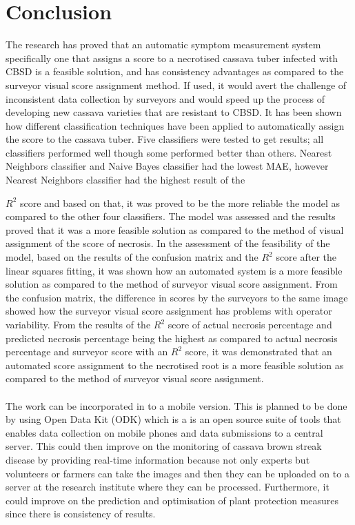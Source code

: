 \documentclass[conference]{IEEEtran}
\begin{document}
{\section{Conclusion}
The research has proved that an automatic symptom measurement system specifically one that assigns a score to a necrotised cassava tuber infected with CBSD is a feasible solution, and has consistency advantages as compared to the surveyor visual score assignment method. If used, it would avert the challenge of inconsistent data collection by surveyors and would speed up the process of developing new cassava varieties that are resistant to CBSD. It has been shown how different classification techniques have been applied to automatically assign the score to the cassava tuber. Five classifiers were tested to get results; all classifiers performed well though some performed better than others. Nearest Neighbors classifier and Naive Bayes classifier had the lowest MAE, however Nearest Neighbors classifier had the highest result of the {$R^{2}$ score and based on that, it was proved to be the more reliable the model as compared to the other four classifiers. The model was assessed and the results proved that it was a more feasible solution as compared to the method of visual assignment of the score of necrosis. In the assessment of the feasibility of the model, based on the results of the confusion matrix and the $R^{2}$ score after the linear squares fitting, it was shown how an automated system is a more feasible solution as compared to the method of surveyor visual score assignment. From the confusion matrix, the difference in scores by the surveyors to the same image showed how the surveyor visual score assignment has problems with operator variability. From the results of the $R^{2}$ score of actual necrosis percentage and predicted necrosis percentage being the highest as compared to actual necrosis percentage and surveyor score with an $R^{2}$ score, it was demonstrated that an automated score assignment to the necrotised root is a more feasible solution as compared to the method of surveyor visual score assignment.\\ \\ The work can be incorporated in to a mobile version. This is planned to be done by using Open Data Kit (ODK) which is a is an open source suite of tools that enables data collection on mobile phones and data submissions to a central server. This could then improve on the monitoring of cassava brown streak disease by providing real-time information because not only experts but volunteers or farmers can take the images and then they can be uploaded on to a server at the research institute where they can be processed. Furthermore, it could improve on the prediction and optimisation of plant protection measures since there is consistency of results.


}}
\end{document}
